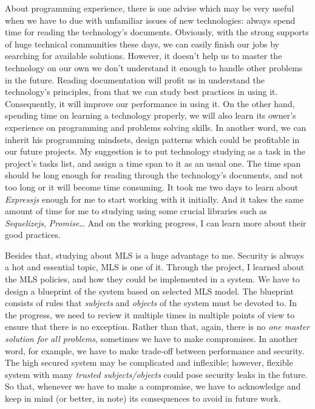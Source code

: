 About programming experience, there is one advise which may be very useful when we have to due with unfamiliar issues of new technologies: always spend time for reading the technology's documents.
Obviously, with the strong supports of huge technical communities these days, we can easily finish our jobs by searching for available solutions.
However, it doesn't help us to master the technology on our own \ie we don't understand it enough to handle other problems in the future.
Reading documentation will profit us in understand the technology's principles, from that we can study best practices in using it.
Consequently, it will improve our performance in using it.
On the other hand, spending time on learning a technology properly, we will also learn its owner's experience on programming and problems solving skills.
In another word, we can inherit his programming mindsets, design patterns which could be profitable in our future projects.
My suggestion is to put technology studying as a task in the project's tasks list, and assign a time span to it as an usual one.
The time span should be long enough for reading through the technology's documents, and not too long or it will become time consuming.
It took me two days to learn about \emph{Expressjs} enough for me to start working with it initially.
And it takes the same amount of time for me to studying using some crucial libraries such as \emph{Sequelizejs}, \emph{Promise}\dots
And on the working progress, I can learn more about their good practices.

Besides that, studying about MLS is a huge advantage to me.
Security is always a hot and essential topic, MLS is one of it.
Through the project, I learned about the MLS policies, and how they could be implemented in a system.
We have to design a blueprint of the system based on selected MLS model.
The blueprint consists of rules that \emph{subjects} and \emph{objects} of the system must be devoted to.
In the progress, we need to review it multiple times in multiple points of view to ensure that there is no exception.
Rather than that, again, there is no \emph{one master solution for all problems}, sometimes we have to make compromises.
In another word, for example, we have to make trade-off between performance and security.
The high secured system may be complicated and inflexible; however, flexible system with many \emph{trusted subjects/objects} could pose security leaks in the future.
So that, whenever we have to make a compromise, we have to acknowledge and keep in mind (or better, in note) its consequences to avoid in future work.

